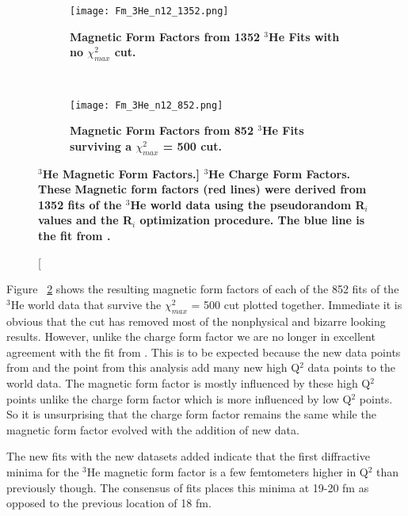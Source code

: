 \begin{figure}[!ht]
\begin{subfigure}{1.\textwidth}
  \centering
  \texttt{[image: Fm\_3He\_n12\_1352.png]}
  \caption{\bf{Magnetic Form Factors from 1352 $^3$He Fits with no $\chi^2_{max}$ cut.}}
  \label{fig:3he_fm_no_cut}
\end{subfigure}\\
\begin{subfigure}{1.\textwidth}
  \centering
  \texttt{[image: Fm\_3He\_n12\_852.png]}
  \caption{\bf{Magnetic Form Factors from 852 $^3$He Fits surviving a $\chi^2_{max}$ = 500 cut.}}
  \label{fig:3he_fm_cut}
\end{subfigure}
\caption[\bf{$^3$He Magnetic Form Factors.}] {
{\bf{$^3$He Charge Form Factors.}} These Magnetic form factors (red lines) were derived from 1352 fits of the $^3$He world data using the pseudorandom R$_i$ values and the R$_i$ optimization procedure. The blue line is the fit from \cite{Article:Amroun}.}
\label{fig:3he_fm}
\end{figure}

Figure ~\ref{fig:3he_fm_cut} shows the resulting magnetic form factors of each of the 852 fits of the $^3$He world data that survive the $\chi^2_{max}$ = 500 cut plotted together. Immediate it is obvious that the cut has removed most of the nonphysical and bizarre looking results. However, unlike the charge form factor we are no longer in excellent agreement with the fit from \cite{Article:Amroun}. This is to be expected because the new data points from \cite{Article:Alex} and the point from this analysis add many new high Q$^2$ data points to the world data. The magnetic form factor is mostly influenced by these high Q$^2$ points unlike the charge form factor which is more influenced by low Q$^2$ points. So it is unsurprising that the charge form factor remains the same while the magnetic form factor evolved with the addition of new data.

The new fits with the new datasets added indicate that the first diffractive minima for the $^3$He magnetic form factor is a few femtometers higher in Q$^2$ than previously though. The consensus of fits places this minima at 19-20 fm as opposed to the previous location of 18 fm.  


